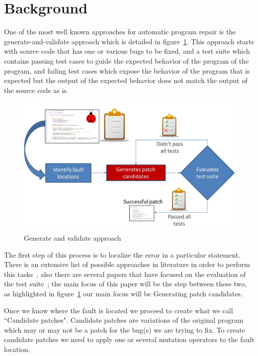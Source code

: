\documentclass[conference]{IEEEtran}
\begin{document}
\section{Background} \label{background}

One of the most well known approaches for automatic program repair is the
generate-and-validate approach which is detailed in figure~\ref{fig:generateandvalidate}. This approach starts with source code that
has one or various bugs to be fixed, and a test suite which contains passing
test cases to guide the expected behavior of the program of the program, and failing test 
cases which expose the behavior of the program that is expected but the output
of the expected behavior does not match the output of the source code as is.



\begin{figure}[!h]
  \centering
    \includegraphics[scale=0.25]{Picture1}
  \caption{Generate and validate approach}
  \label{fig:generateandvalidate}
\end{figure}

The first step of this process is to localize the error in a particular 
statement. There is an extensive list of possible approaches in literature in 
order to perform this tasks~\cite{Jones05,Jones02,Chen02,legoues12,Qi13}, also there are several papers that have focused on the evaluation of the test suite~\cite{Qi13,fan15}; the main focus of this paper will be the step between these two, as highlighted in figure~\ref{fig:generateandvalidate} our main focus will be Generating patch candidates.

Once we know where the fault is located we proceed to create what we call 
``Candidate patches". Candidate patches are variations of the original program 
which may or may not be a patch for the bug(s) we are trying to fix. To 
create candidate patches we need to apply one or several mutation operators to 
the fault location. 
\end{document}
